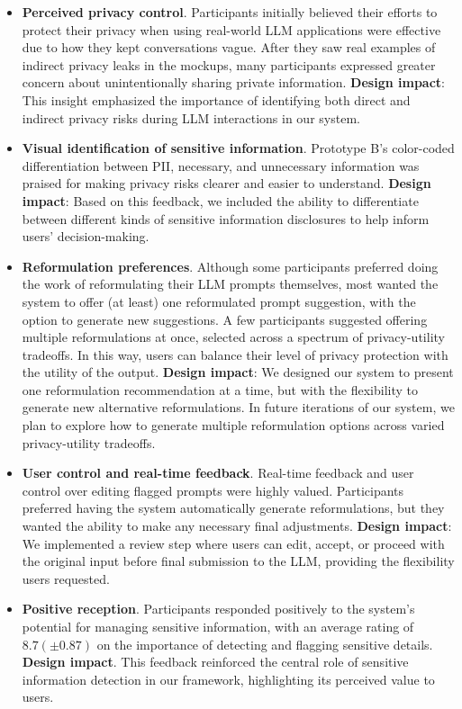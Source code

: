 \begin{itemize}[leftmargin=1em]
    \item \textbf{Perceived privacy control}. Participants initially believed their efforts to protect their privacy when using real-world LLM applications were effective due to how they kept conversations vague. After they saw real examples of indirect privacy leaks in the mockups, many participants expressed greater concern about unintentionally sharing private information. \textbf{Design impact}: This insight emphasized the importance of identifying both direct and indirect privacy risks during LLM interactions in our system.
    \item \textbf{Visual identification of sensitive information}. Prototype B's color-coded differentiation between PII, necessary, and unnecessary information was praised for making privacy risks clearer and easier to understand. \textbf{Design impact}: Based on this feedback, we included the ability to differentiate between different kinds of sensitive information disclosures to help inform users' decision-making.
    \item \textbf{Reformulation preferences}. Although some participants preferred doing the work of reformulating their LLM prompts themselves, most wanted the system to offer (at least) one reformulated prompt suggestion, with the option to generate new suggestions. A few participants suggested offering multiple reformulations at once, selected across a spectrum of privacy-utility tradeoffs. In this way, users can balance their level of privacy protection with the utility of the output. \textbf{Design impact}: We designed our system to present one reformulation recommendation at a time, but with the flexibility to generate new alternative reformulations. In future iterations of our system, we plan to explore how to generate multiple reformulation options across varied privacy-utility tradeoffs.
    \item \textbf{User control and real-time feedback}. Real-time feedback and user control over editing flagged prompts were highly valued. Participants preferred having the system automatically generate reformulations, but they wanted the ability to make any necessary final adjustments. \textbf{Design impact}: We implemented a review step where users can edit, accept, or proceed with the original input before final submission to the LLM, providing the flexibility users requested.
    \item \textbf{Positive reception}. Participants responded positively to the system’s potential for managing sensitive information, with an average rating of $8.7 (\pm 0.87)$ on the importance of detecting and flagging sensitive details. \textbf{Design impact}. This feedback reinforced the central role of sensitive information detection in our framework, highlighting its perceived value to users.

\end{itemize}
